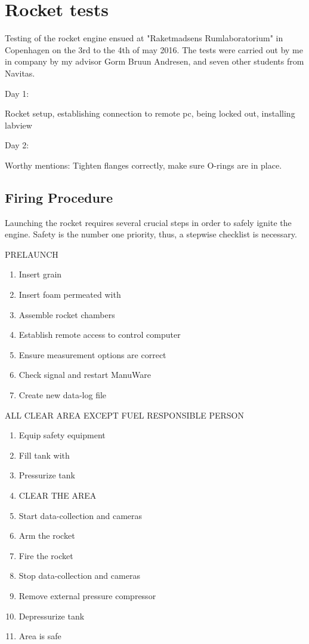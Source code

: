 \chapter{Rocket tests}

Testing of the rocket engine ensued at "Raketmadsens Rumlaboratorium" in Copenhagen on the 3rd to the 4th of may 2016. The tests were carried out by me in company by my advisor Gorm Bruun Andresen, and seven other students from Navitas.

Day 1:

Rocket setup, establishing connection to remote pc, being locked out, installing labview

Day 2:

Worthy mentions: Tighten flanges correctly, make sure O-rings are in place.


\section{Firing Procedure}
Launching the rocket requires several crucial steps in order to safely ignite the engine. Safety is the number one priority, thus, a stepwise checklist is necessary.

PRELAUNCH
\begin{enumerate}
  \itemsep0em
  \item Insert grain
  \item Insert foam permeated with 
  \item Assemble rocket chambers
  \item Establish remote access to control computer
  \item Ensure measurement options are correct
  \item Check signal and restart ManuWare
  \item Create new data-log file
\end{enumerate}
ALL CLEAR AREA EXCEPT FUEL RESPONSIBLE PERSON
\begin{enumerate}
  \itemsep0em
  \item Equip  safety equipment
  \item Fill tank with 
  \item Pressurize tank
  \item CLEAR THE AREA
  \item Start data-collection and cameras
  \item Arm the rocket
  \item Fire the rocket
  \item Stop data-collection and cameras
  \item Remove external pressure compressor
  \item Depressurize tank
  \item Area is safe
\end{enumerate}


